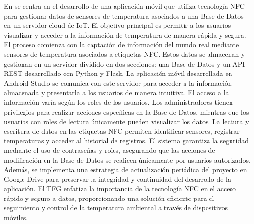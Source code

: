 \bigbreak
En \cite{castillo_herrero_desarrollo_2020} se centra en el desarrollo de una aplicación móvil que utiliza tecnología NFC para gestionar datos de sensores de temperatura asociados a una Base de Datos en un servidor cloud de IoT. El objetivo principal es permitir a los usuarios visualizar y acceder a la información de temperatura de manera rápida y segura. El proceso comienza con la captación de información del mundo real mediante sensores de temperatura asociados a etiquetas NFC. Estos datos se almacenan y gestionan en un servidor dividido en dos secciones: una Base de Datos y un API REST desarrollado con Python y Flask. La aplicación móvil desarrollada en Android Studio se comunica con este servidor para acceder a la información almacenada y presentarla a los usuarios de manera intuitiva. El acceso a la información varía según los roles de los usuarios. Los administradores tienen privilegios para realizar acciones específicas en la Base de Datos, mientras que los usuarios con roles de lectura únicamente pueden visualizar los datos. La lectura y escritura de datos en las etiquetas NFC permiten identificar sensores, registrar temperaturas y acceder al historial de registros. El sistema garantiza la seguridad mediante el uso de contraseñas y roles, asegurando que las acciones de modificación en la Base de Datos se realicen únicamente por usuarios autorizados. Además, se implementa una estrategia de actualización periódica del proyecto en Google Drive para preservar la integridad y continuidad del desarrollo de la aplicación. El TFG enfatiza la importancia de la tecnología NFC en el acceso rápido y seguro a datos, proporcionando una solución eficiente para el seguimiento y control de la temperatura ambiental a través de dispositivos móviles.

